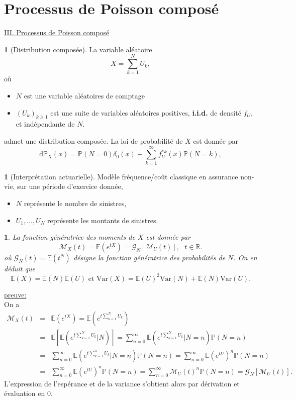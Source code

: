 \documentclass[8pt,notheorems]{beamer}
\def \E{\mathbb E}
\renewcommand{\Pr}{\mathbb{P}}
\newtheorem{prop}{\translate{Proposition}}
\theoremstyle{definition}
\newtheorem{definition}{\translate{Definition}}
\theoremstyle{example}
\theoremstyle{mystyle}
\newtheorem{remark}{\translate{Remarque}}
\theoremstyle{plain}
\begin{document}
\section{Processus de Poisson composé}
\begin{frame}[allowframebreaks]
\underline{III. Processus de Poisson composé}\\
\begin{definition}[Distribution composée]
La variable aléatoire
$$
X=\sum_{k=1}^{N}U_k,
$$
où
\begin{itemize}
  \item $N$ est une variable aléatoires de comptage
  \item $(U_k)_{k\geq1}$ est une suite de variables aléatoires positives, \textbf{i.i.d.} de densité $f_U$, et indépendante de $N$.
\end{itemize}
admet une distribution composée. La loi de probabilité de $X$ est donnée par
$$
\text{d}\Pr_X(x)=\Pr(N=0)\delta_0(x)+\sum_{k=1}^{\infty}f^{\ast k}_U(x)\Pr(N=k),
$$
\end{definition}
\begin{remark}[Interprétation actuarielle]
Modèle fréquence/coût classique en assurance non-vie, sur une période d'exercice donnée,
\begin{itemize}
  \item $N$ représente le nombre de sinistres,
  \item $U_1,\ldots, U_N$ représente les montants de sinistres.
\end{itemize}
\end{remark}
\begin{prop}
La fonction génératrice des moments de $X$ est donnée par
$$
\mathcal{M}_X(t)=\E\left(e^{tX}\right)=\mathcal{G}_N\left[\mathcal{M}_U(t)\right], \text{ }t\in\mathbb{R}.
$$
 où $\mathcal{G}_N(t)=\E(t^N)$ désigne la fonction génératrice des probabilités de $N$. On en déduit que
$$
\E(X)=\E(N)\E(U)\text{ et }\text{Var}(X)=\mathbb{E}(U)^2\text{Var}(N)+\mathbb{E}(N)\text{Var}(U).
$$
\end{prop}
\underline{preuve:}\\
On a
\begin{eqnarray*}
\mathcal{M}_X(t)&=&\E\left(e^{tX}\right)=\E\left(e^{t\sum_{k=1}^{N}U_k}\right)\\
&=&\E\left[\E\left(e^{t\sum_{k=1}^{N}U_k}|N\right)\right]=\sum_{n=0}^{\infty}\E\left(e^{t\sum_{k=1}^{N}U_k}|N=n\right)\Pr(N=n)\\
&=&\sum_{n=0}^{\infty}\E\left(e^{t\sum_{k=1}^{n}U_k}|N=n\right)\Pr(N=n)=\sum_{n=0}^{\infty}\E\left(e^{tU}\right)^n\Pr(N=n)\\
&=&\sum_{n=0}^{\infty}\E\left(e^{tU}\right)^n\Pr(N=n)=\sum_{n=0}^{\infty}\mathcal{M}_U(t)^n\Pr(N=n)=\mathcal{G}_N\left[\mathcal{M}_U(t)\right].
\end{eqnarray*}
L'expression de l'espérance et de la variance s'obtient alors par dérivation et évaluation en $0$.
\end{frame}
\end{document}
